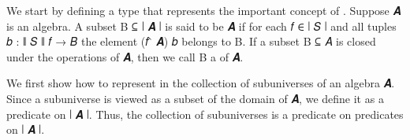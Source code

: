 We start by defining a type that represents the important concept of . Suppose \ab 𝑨 is an algebra. A subset \ab B \af ⊆ \af ∣ \ab 𝑨 \af ∣ is said to be  \ab 𝑨 if for each \ab 𝑓 ∈ \af ∣ \ab 𝑆 \af ∣ and all tuples \ab 𝑏 \as : \af ∥ \ab 𝑆 \af ∥ \ab 𝑓 \as → \ab 𝐵 the element (\ab 𝑓 \af ̂ \ab 𝑨) \ab 𝑏 belongs to \ab B. If a subset \ab B \af ⊆ \ab 𝐴 is closed under the operations of \ab 𝑨, then we call \ab B a  of \ab 𝑨.

We first show how to represent in \agda the collection of subuniverses of an algebra \ab 𝑨.  Since a subuniverse is viewed as a subset of the domain of \ab 𝑨, we define it as a predicate on \af ∣ \ab 𝑨 \af ∣.  Thus, the collection of subuniverses is a predicate on predicates on \af ∣ \ab 𝑨 \af ∣.
\ccpad
\begin{code}%
\>[0]\AgdaSpace{}%
\AgdaModule{\AgdaUnderscore{}}\AgdaSpace{}%
\AgdaSymbol{\{}\AgdaSpace{}%
\AgdaSpace{}%
\AgdaSymbol{:}\AgdaSpace{}%
\AgdaSymbol{\}}\AgdaSpace{}%
\<%
\\
%
\\[\AgdaEmptyExtraSkip]%
\>[0][@{}l@{\AgdaIndent{0}}]%
\>[1]\AgdaSpace{}%
\AgdaSymbol{:}\AgdaSpace{}%
\AgdaSymbol{(}\AgdaSpace{}%
\AgdaSymbol{:}\AgdaSpace{}%
\AgdaSpace{}%
\AgdaSpace{}%
\AgdaSymbol{)}\AgdaSpace{}%
\AgdaSpace{}%
\AgdaSpace{}%
\AgdaSymbol{(}\AgdaSpace{}%
\AgdaSpace{}%
\AgdaSpace{}%
\AgdaSpace{}%
\AgdaSymbol{)(}\AgdaSpace{}%
\AgdaSpace{}%
\AgdaSpace{}%
\AgdaSpace{}%
\AgdaSpace{}%
\AgdaSpace{}%
\AgdaSymbol{)}\<%
\\
%
\>[1]\AgdaSpace{}%
\AgdaSpace{}%
\AgdaSpace{}%
\AgdaSymbol{=}\AgdaSpace{}%
\AgdaSymbol{(}\AgdaSpace{}%
\AgdaSymbol{:}\AgdaSpace{}%
\AgdaSpace{}%
\AgdaSpace{}%
\AgdaSymbol{)(}\AgdaSpace{}%
\AgdaSymbol{:}\AgdaSpace{}%
\AgdaSpace{}%
\AgdaSpace{}%
\AgdaSpace{}%
\AgdaSpace{}%
\AgdaSpace{}%
\AgdaSpace{}%
\AgdaSpace{}%
\AgdaSymbol{)}\AgdaSpace{}%
\AgdaSpace{}%
\AgdaSpace{}%
\AgdaSpace{}%
\AgdaSpace{}%
\AgdaSpace{}%
\AgdaSpace{}%
\AgdaSymbol{(}\AgdaSpace{}%
\AgdaSpace{}%
\AgdaSymbol{)}\AgdaSpace{}%
\AgdaSpace{}%
\AgdaSpace{}%
\<%
\end{code}
